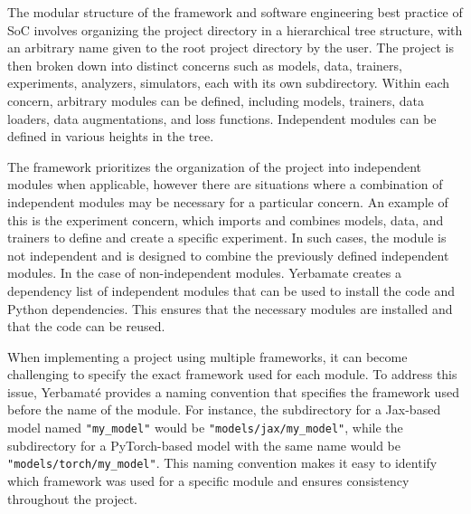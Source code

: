 
 The modular structure of the framework and software engineering best practice of SoC involves organizing the project directory in a hierarchical tree structure, with an arbitrary name given to the root project directory by the user. The project is then broken down into distinct concerns such as models, data, trainers, experiments, analyzers, simulators, each with its own subdirectory. Within each concern, arbitrary modules can be defined, including models, trainers, data loaders, data augmentations, and loss functions. Independent modules can be defined in various heights in the tree.

The framework prioritizes the organization of the project into independent modules when applicable, however there are situations where a combination of independent modules may be necessary for a particular concern. An example of this is the experiment concern, which imports and combines models, data, and trainers to define and create a specific experiment. In such cases, the module is not independent and is designed to combine the previously defined independent modules. 
In the case of non-independent modules. 
Yerbamate creates a dependency list of independent modules that can be used to install the code and Python dependencies. This ensures that the necessary modules are installed and that the code can be reused. 

When implementing a project using multiple frameworks, it can become challenging to specify the exact framework used for each module. To address this issue, Yerbamaté provides a naming convention that specifies the framework used before the name of the module. For instance, the subdirectory for a Jax-based model named \texttt{"my\_model"} would be \texttt{"models/jax/my\_model"}, while the subdirectory for a PyTorch-based model with the same name would be \texttt{"models/torch/my\_model"}. This naming convention makes it easy to identify which framework was used for a specific module and ensures consistency throughout the project.


